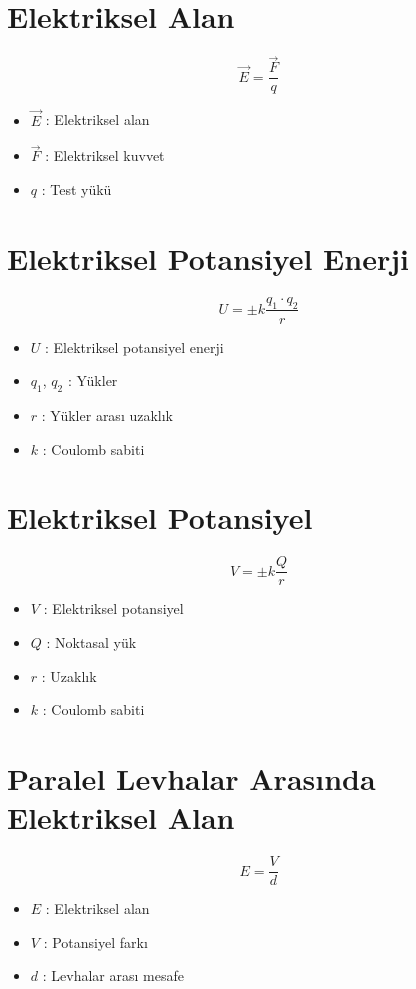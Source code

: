 \documentclass[a4paper, 11pt, titlepage]{article}
\begin{document}
\section{Elektriksel Alan}
\[
\vec{E} = \frac{\vec{F}}{q}
\]
\begin{itemize}
  \item $\vec{E}$ : Elektriksel alan
  \item $\vec{F}$ : Elektriksel kuvvet
  \item $q$ : Test yükü
\end{itemize}

\section{Elektriksel Potansiyel Enerji}
\[
U = \pm k \frac{q_1 \cdot q_2}{r}
\]
\begin{itemize}
  \item $U$ : Elektriksel potansiyel enerji
  \item $q_1$, $q_2$ : Yükler
  \item $r$ : Yükler arası uzaklık
  \item $k$ : Coulomb sabiti
\end{itemize}

\section{Elektriksel Potansiyel}
\[
V = \pm k \frac{Q}{r}
\]
\begin{itemize}
  \item $V$ : Elektriksel potansiyel
  \item $Q$ : Noktasal yük
  \item $r$ : Uzaklık
  \item $k$ : Coulomb sabiti
\end{itemize}

\section[P.L.A. Elektriksel Alan]{Paralel Levhalar Arasında \\ Elektriksel Alan}
\[
E = \frac{V}{d}
\]
\begin{itemize}
  \item $E$ : Elektriksel alan
  \item $V$ : Potansiyel farkı
  \item $d$ : Levhalar arası mesafe
\end{itemize}
\end{document}
